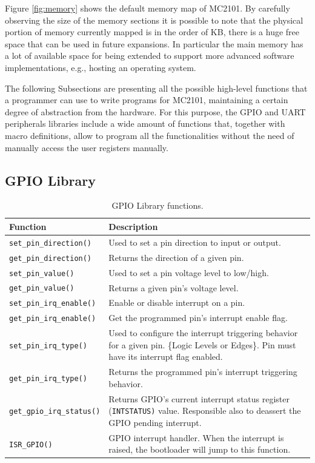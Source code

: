 Figure \ref{fig:memory} shows the default memory map of MC2101. By carefully observing the size of the memory sections it is possible to note that the physical portion of memory currently mapped is in the order of KB, there is a huge free space that can be used in future expansions. In particular the main memory has a lot of available space for being extended to support more advanced software implementations, e.g., hosting an operating system.

The following Subsections are presenting all the possible high-level functions that a programmer can use to write programs for MC2101, maintaining a certain degree of abstraction from the hardware. For this purpose, the GPIO and UART peripherals libraries include a wide amount of functions that, together with macro definitions, allow to program all the functionalities without the need of manually access the user registers manually.

\subsection{GPIO Library}
\begin{table}
\centering
\begin{tabular}{| l | p{7cm} |}
    \hline
    \textbf{Function} & \textbf{Description}\\ \hline
    \texttt{set\_pin\_direction()} & Used to set a pin direction to input or output. \\ \hline
    \texttt{get\_pin\_direction()} & Returns the direction of a given pin. \\ \hline
    \texttt{set\_pin\_value()} & Used to set a pin voltage level to low/high.  \\ \hline
    \texttt{get\_pin\_value()} & Returns a given pin's voltage level.   \\ \hline
    \texttt{set\_pin\_irq\_enable()} & Enable or disable interrupt on a pin.  \\ \hline
    \texttt{get\_pin\_irq\_enable()} & Get the programmed pin's interrupt enable flag.  \\ \hline
    \texttt{set\_pin\_irq\_type()}  & Used to configure the interrupt triggering behavior for a given pin. \{Logic Levels or Edges\}. Pin must have its interrupt flag enabled. \\ \hline
    \texttt{get\_pin\_irq\_type()} & Returns the programmed pin's interrupt triggering behavior.  \\ \hline
    \texttt{get\_gpio\_irq\_status()} & Returns GPIO's current interrupt status register (\texttt{INTSTATUS)} value. Responsible also to deassert the GPIO pending interrupt.  \\ \hline
    \texttt{ISR\_GPIO()} & GPIO interrupt handler. When the interrupt is raised, the bootloader will jump to this function.  \\ \hline
    \hline
\end{tabular}
\caption{GPIO Library functions.}
\label{tab:gpiofunc} %
\end{table}

